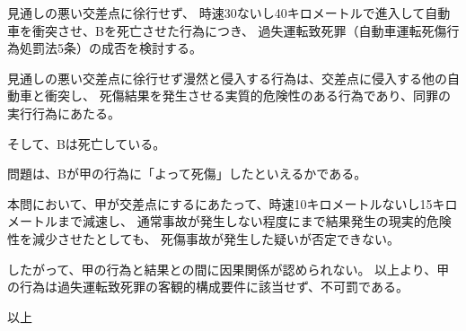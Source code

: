 \documentclass[11pt]{jsarticle}
\title{\vspace{-30mm}{\textgt{\Large{\fbox{４} 黄色点滅信号}}}}
\date{\vspace{-15mm}}
\begin{document}
\maketitle
	\sectionB{}
		見通しの悪い交差点に徐行せず、
		時速30ないし40キロメートルで進入して自動車を衝突させ、Bを死亡させた行為につき、
		過失運転致死罪（自動車運転死傷行為処罰法5条）の成否を検討する。

		\sectionC{}
			見通しの悪い交差点に徐行せず漫然と侵入する行為は、交差点に侵入する他の自動車と衝突し、
			死傷結果を発生させる実質的危険性のある行為であり、同罪の実行行為にあたる。
		
		\sectionC{}
			そして、Bは死亡している。
			
		\sectionC{}
			問題は、Bが甲の行為に「よって死傷」したといえるかである。
			
			本問において、甲が交差点にするにあたって、時速10キロメートルないし15キロメートルまで減速し、
			通常事故が発生しない程度にまで結果発生の現実的危険性を減少させたとしても、
			死傷事故が発生した疑いが否定できない。
			
			したがって、甲の行為と結果との間に因果関係が認められない。
	\sectionB{}
		以上より、甲の行為は過失運転致死罪の客観的構成要件に該当せず、不可罰である。
	\begin{flushright}
  		以上	
	\end{flushright}
\end{document}

